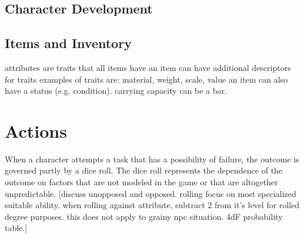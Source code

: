 \documentclass[12pt]{article}
\newcommand{\notes}[1]{{\color{Tan} #1}}
\begin{document}




\subsection{Character Development}\label{sec:dev}





\subsection{Items and Inventory} \label{sec:items}
\notes{attributes are traits that all items have
an item can have additional descriptors for traits
examples of traits are: material, weight, scale, value
an item can also have a status (e.g. condition).
carrying capacity can be a bar.}


\section{Actions}\label{sec:actions}
When a character attempts a task that has a possibility of failure, the outcome is governed partly by a dice roll.
The dice roll represents the dependence of the outcome on factors that are not modeled in the game or that are altogether unpredictable.
\notes{[discuss unopposed and opposed. rolling focus on most specialized suitable ability. when rolling against attribute, subtract 2 from it's level for rolled degree purposes. this does not apply to grainy npc situation. 4dF probability table.]}
\end{document}
